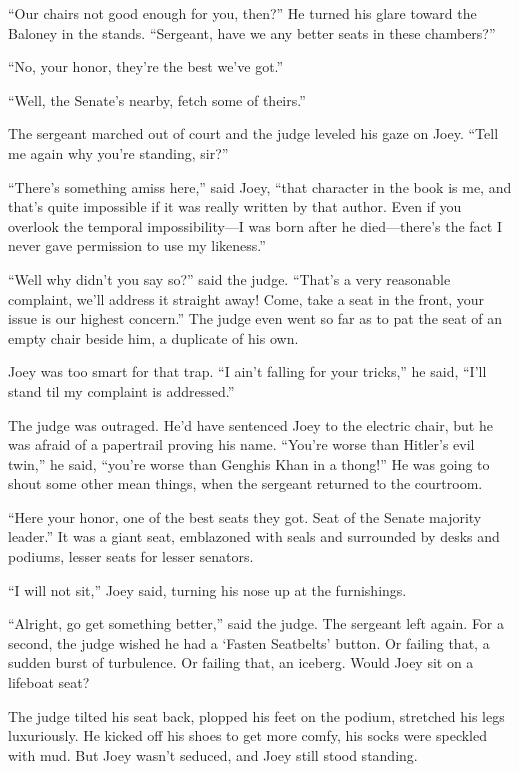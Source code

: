 \documentclass[oneside]{book}
\begin{document}
``Our chairs not good enough for you, then?''  He turned his glare toward
the Baloney in the stands.
``Sergeant, have we any better seats in these chambers?''

``No, your honor, they're the best we've got.''

``Well, the Senate's nearby, fetch some of theirs.''

The sergeant marched out of court and the judge leveled his gaze on Joey.
``Tell me again why you're standing, sir?''

``There's something amiss here,'' said Joey, ``that character in the book is me,
and that's quite impossible if it was really written by that author.
Even if you overlook the temporal impossibility---I was born after he
died---there's the fact I never gave permission to use my likeness.''

``Well why didn't you say so?'' said the judge.  ``That's a very reasonable
complaint, we'll address it straight away!  Come, take a seat in the front,
your issue is our highest concern.''  The judge even went so far as to pat the
seat of an empty chair beside him, a duplicate of his own.

Joey was too smart for that trap.  ``I ain't falling for your tricks,''
he said, ``I'll stand til my complaint is addressed.''

The judge was outraged.  He'd have sentenced Joey to the electric chair,
but he was afraid of a papertrail proving his name.
``You're worse than Hitler's evil twin,''
he said, ``you're worse than Genghis Khan in a thong!''  He was going to shout some
other mean things, when the sergeant returned to the courtroom.

``Here your honor, one of the best seats they got.  Seat of the Senate majority
leader.''  It was a giant seat, emblazoned with seals and surrounded by
desks and podiums, lesser seats for lesser senators.

``I will not sit,'' Joey said, turning his nose up at the furnishings.

``Alright, go get something better,'' said the judge.  The sergeant left again.
For a second, the judge wished he had a `Fasten Seatbelts' button.
Or failing that, a sudden burst of turbulence.
Or failing that, an iceberg.  Would Joey sit on a lifeboat seat?

The judge tilted his seat back, plopped his feet on the podium, stretched
his legs luxuriously.
He kicked off his shoes to get more comfy, his socks were speckled with mud.
But Joey wasn't seduced, and Joey still stood standing.
\end{document}
